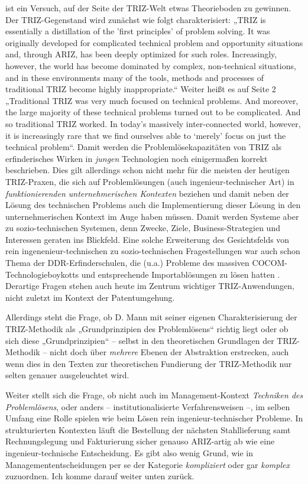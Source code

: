 \documentclass[12pt,a4paper]{article}
\begin{document}
\cite{Mann2019} ist ein Versuch, auf der Seite der TRIZ-Welt etwas
Theorieboden zu gewinnen.  Der TRIZ-Gegenstand wird zunächst wie folgt
charakterisiert: „TRIZ is essentially a distillation of the 'first principles'
of problem solving. It was originally developed for complicated technical
problem and opportunity situations and, through ARIZ, has been deeply
optimized for such roles.  Increasingly, however, the world has become
dominated by complex, non-technical situations, and in these environments many
of the tools, methods and processes of traditional TRIZ become highly
inappropriate.“ Weiter heißt es auf Seite 2 „Traditional TRIZ was very much
focused on technical problems.  And moreover, the large majority of these
technical problems turned out to be complicated. And so traditional TRIZ
worked. In today’s massively inter-connected world, however, it is
increasingly rare that we find ourselves able to ‘merely’ focus on just the
technical problem“.  Damit werden die Problemlösekapazitäten von TRIZ als
erfinderisches Wirken in \emph{jungen} Technologien noch einigermaßen korrekt
beschrieben. Dies gilt allerdings schon nicht mehr für die meisten der
heutigen TRIZ-Praxen, die sich auf Problemlösungen (auch ingenieur-technischer
Art) in \emph{funktionierenden unternehmerischen Kontexten} beziehen und damit
neben der Lösung des technischen Problems auch die Implementierung dieser
Lösung in den unternehmerischen Kontext im Auge haben müssen. Damit werden
Systeme aber zu sozio-technischen Systemen, denn Zwecke, Ziele,
Business-Strategien und Interessen geraten ins Blickfeld.  Eine solche
Erweiterung des Gesichtsfelds von rein ingenenieur-technischen zu
sozio-technischen Fragestellungen war auch schon Thema der
DDR-Erfinderschulen, die (u.a.) Probleme des massiven
COCOM-Technologieboykotts und entsprechende Importablösungen zu lösen hatten
\cite{Graebe2019a}.  Derartige Fragen stehen auch heute im Zentrum wichtiger
TRIZ-Anwendungen, nicht zuletzt im Kontext der Patentumgehung.

Allerdings steht die Frage, ob D. Mann mit seiner eigenen Charakterisierung
der TRIZ-Methodik als „Grundprinzipien des Problemlösens“ richtig liegt oder
ob sich diese „Grundprinzipien“ -- selbst in den theoretischen Grundlagen der
TRIZ-Methodik -- nicht doch über \emph{mehrere} Ebenen der Abstraktion
erstrecken, auch wenn dies in den Texten zur theoretischen Fundierung der
TRIZ-Methodik nur selten genauer ausgeleuchtet wird.

Weiter stellt sich die Frage, ob nicht auch im Management-Kontext
\emph{Techniken des Problemlösens}, oder anders -- institutionalisierte
Verfahrensweisen --, im selben Umfang eine Rolle spielen wie beim Lösen rein
ingenieur-technischer Probleme. In strukturierten Kontexten läuft die
Bestellung der nächsten Stahllieferung samt Rechnungslegung und Fakturierung
sicher genauso ARIZ-artig ab wie eine ingenieur-technische Entscheidung. Es
gibt also wenig Grund, wie in \cite{Mann2019} Managemententscheidungen per se
der Kategorie \emph{kompliziert} oder gar \emph{komplex} zuzuordnen.  Ich
komme darauf weiter unten zurück.
\newpage
\end{document}
